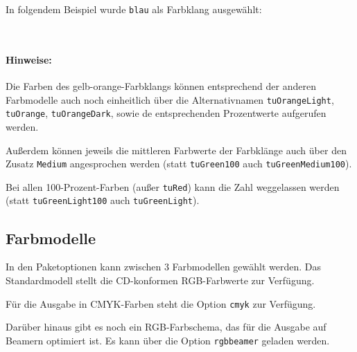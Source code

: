 In folgendem Beispiel wurde \lstinline{blau} als Farbklang ausgewählt:

\\[-1ex]

\paragraph{Hinweise:}
Die Farben des gelb-orange-Farbklangs können entsprechend der anderen
Farbmodelle auch noch einheitlich über die Alternativnamen
\lstinline{tuOrangeLight}, \lstinline{tuOrange},
\lstinline{tuOrangeDark}, sowie de entsprechenden Prozentwerte aufgerufen
werden.

Außerdem können jeweils die mittleren Farbwerte der Farbklänge auch über den
Zusatz \lstinline{Medium} angesprochen werden (statt \lstinline{tuGreen100} auch
\lstinline{tuGreenMedium100}).

Bei allen 100-Prozent-Farben (außer \lstinline{tuRed}) kann die
Zahl weggelassen werden (statt \lstinline{tuGreenLight100} auch 
\lstinline{tuGreenLight}).

\subsection{Farbmodelle}

In den Paketoptionen kann zwischen 3 Farbmodellen gewählt werden.
Das Standardmodell stellt die CD-konformen RGB-Farbwerte zur Verfügung.

Für die Ausgabe in CMYK-Farben steht die Option \lstinline!cmyk! zur Verfügung.

Darüber hinaus gibt es noch ein RGB-Farbschema, das für die Ausgabe auf
Beamern optimiert ist. Es kann über die Option \lstinline!rgbbeamer! geladen
werden.
